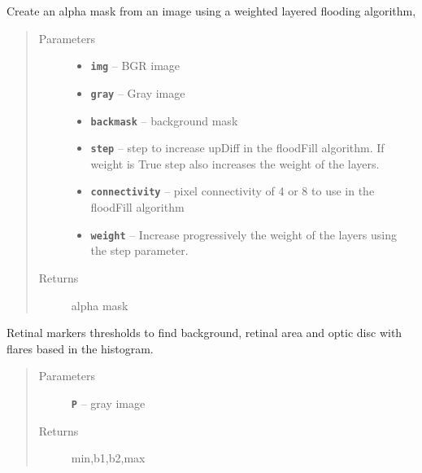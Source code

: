 \documentclass[letterpaper,10pt,english]{sphinxmanual}
\begin{document}
\begin{fulllineitems}
\label{RRtoolbox.tools:RRtoolbox.tools.segmentation.layeredfloods}
Create an alpha mask from an image using a weighted layered flooding algorithm,
\begin{quote}\begin{description}
\item[{Parameters}] \leavevmode\begin{itemize}
\item {} 
\textbf{\texttt{img}} -- BGR image

\item {} 
\textbf{\texttt{gray}} -- Gray image

\item {} 
\textbf{\texttt{backmask}} -- background mask

\item {} 
\textbf{\texttt{step}} -- step to increase upDiff in the floodFill algorithm. If weight is True
step also increases the weight of the layers.

\item {} 
\textbf{\texttt{connectivity}} -- pixel connectivity of 4 or 8 to use in the floodFill algorithm

\item {} 
\textbf{\texttt{weight}} -- Increase progressively the weight of the layers using the step parameter.

\end{itemize}

\item[{Returns}] \leavevmode
alpha mask

\end{description}\end{quote}

\end{fulllineitems}


\begin{fulllineitems}
\label{RRtoolbox.tools:RRtoolbox.tools.segmentation.retina_markers_thresh}
Retinal markers thresholds to find background,
retinal area and optic disc with flares based
in the histogram.
\begin{quote}\begin{description}
\item[{Parameters}] \leavevmode
\textbf{\texttt{P}} -- gray image

\item[{Returns}] \leavevmode
min,b1,b2,max

\end{description}\end{quote}

\end{fulllineitems}
\end{document}
